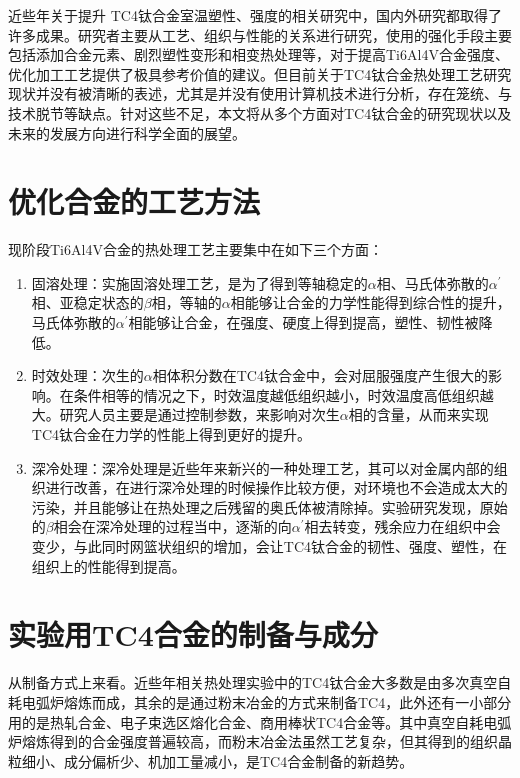 \documentclass[
class = book,
zihao = -4,
font = noto,
paper = a4paper,
openany
]{easybook}
\newcommand{\ti}{Ti6Al4V}
\begin{document}
近些年关于提升 TC4钛合金室温塑性、强度的相关研究中，国内外研究都取得了许多成果。研究者主要从工艺、组织与性能的关系进行研究，使用的强化手段主要包括添加合金元素、剧烈塑性变形和相变热处理等，对于提高\ti 合金强度、优化加工工艺提供了极具参考价值的建议。但目前关于TC4钛合金热处理工艺研究现状并没有被清晰的表述，尤其是并没有使用计算机技术进行分析，存在笼统、与技术脱节等缺点。针对这些不足，本文将从多个方面对TC4钛合金的研究现状以及未来的发展方向进行科学全面的展望。

\section{优化合金的工艺方法}
现阶段\ti 合金的热处理工艺主要集中在如下三个方面：
\begin{enumerate}
	\item 固溶处理：实施固溶处理工艺，是为了得到等轴稳定的$\alpha $相、马氏体弥散的$ \alpha ^{'} $相、亚稳定状态的$\beta $相，等轴的$\alpha $相能够让合金的力学性能得到综合性的提升，马氏体弥散的$ \alpha ^{'} $相能够让合金，在强度、硬度上得到提高，塑性、韧性被降低\cite{gurong2002}。
	\item 时效处理：次生的$\alpha $相体积分数在TC4钛合金中，会对屈服强度产生很大的影响。在条件相等的情况之下，时效温度越低组织越小，时效温度高低组织越大。研究人员主要是通过控制参数，来影响对次生$\alpha $相的含量，从而来实现TC4钛合金在力学的性能上得到更好的提升。
	\item 深冷处理：深冷处理是近些年来新兴的一种处理工艺，其可以对金属内部的组织进行改善，在进行深冷处理的时候操作比较方便，对环境也不会造成太大的污染，并且能够让在热处理之后残留的奥氏体被清除掉。实验研究发现，原始的$\beta $相会在深冷处理的过程当中，逐渐的向$\alpha^{'} $相去转变，残余应力在组织中会变少，与此同时网篮状组织的增加，会让TC4钛合金的韧性、强度、塑性，在组织上的性能得到提高。
\end{enumerate}

\section{实验用TC4合金的制备与成分}
从制备方式上来看。近些年相关热处理实验中的TC4钛合金大多数是由{多次真空自耗电弧炉熔炼}\cite{renchiqiangGurongshixiaoduiTC4taihejinxianweizuzhihelixuexingnengdeyingxiang2022,ranxingGurongwenduduiTi6Al4VELItaihejinxianweizuzhijixingnengdeyingxiang2021,lilouGurongshixiaoduiTC4hejinzuzhiyujixiexingnengdeyingxiang2014,jingranGurongshixiaoduiTC4hejinzuzhiyuxingnengdeyingxiang2018}而成，其余的是通过粉末冶金\cite{zhanghaoyinGurongShixiaoduiTC4taihejinzuzhihelixuexingnengdeyingxiang2014,xujianGurongshixiaogongyiduiTC4taihejinzuzhijixingnengdeyingxiang2014}的方式来制备TC4，此外还有一小部分用的是热轧合金\cite{LiuWanYingBuTongReChuLiGongYiDuiTi6Al4VTaiHeJinWeiGuanJieGouHeLiXueXingNengYingXiangYingWen2017}、电子束选区熔化合金\cite{leijunleDianzishuxuanquronghuachengxingTC4hejinxianweizuzhiyuxingnengdeyanjiujinzhan2022}、商用棒状TC4合金\cite{LuYuanYuanShiXiaoChuLiDuiTC4TaiHeJinWeiGuanZuZhiHeLiXueXingNengDeYingXiang2019}等。其中真空自耗电弧炉熔炼得到的合金强度普遍较高，而粉末冶金法虽然工艺复杂，但其得到的组织晶粒细小、成分偏析少、机加工量减小，是TC4合金制备的新趋势。
\end{document}
